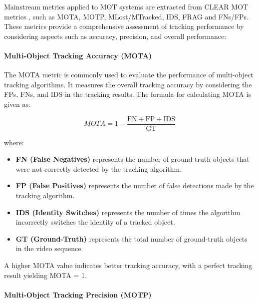 Mainstream metrics applied to MOT systems are extracted from CLEAR \ac{MOT} metrics \cite{bernardin2008evaluating}, such as \acf{MOTA}, \acf{MOTP}, \acf{MLost}/\acf{MTracked}, \ac{IDS}, \ac{FRAG} and \acp{FN}/\acp{FP}. These metrics provide a comprehensive assessment of tracking performance by considering aspects such as accuracy, precision, and overall performance:

\paragraph{Multi-Object Tracking Accuracy (MOTA)}
\label{par:4_MOTA}

The \acf{MOTA} metric is commonly used to evaluate the performance of multi-object tracking algorithms. It measures the overall tracking accuracy by considering the \acp{FP}, \acp{FN}, and \ac{IDS} in the tracking results. The formula for calculating \ac{MOTA} is given as:

\begin{equation}
	MOTA = 1 - \frac{{\text{{FN}} + \text{{FP}} + \text{{IDS}}}}{{\text{{GT}}}}
\end{equation}

where:

\begin{itemize}
	
	\item \textbf{FN (False Negatives)} represents the number of ground-truth objects that were not correctly detected by the tracking algorithm.
	
	\item \textbf{FP (False Positives)} represents the number of false detections made by the tracking algorithm.
	
	\item \textbf{IDS (Identity Switches)} represents the number of times the algorithm incorrectly switches the identity of a tracked object.
	
	\item \textbf{GT (Ground-Truth)} represents the total number of ground-truth objects in the video sequence.
	
\end{itemize}

A higher \ac{MOTA} value indicates better tracking accuracy, with a perfect tracking result yielding MOTA = 1.

\paragraph{Multi-Object Tracking Precision (MOTP)}
\label{par:4_MOTP}


